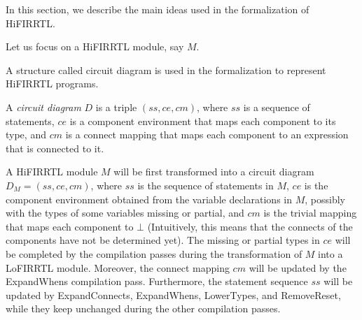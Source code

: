 
In this section, we describe the main ideas used in the formalization of HiFIRRTL.

Let us focus on a HiFIRRTL module, say $M$.

A structure called circuit diagram is used in the formalization to represent HiFIRRTL programs.

\begin{definition}
A \emph{circuit diagram} $D$ is a triple $(ss, ce, cm)$, where $ss$ is a sequence of statements, $ce$ is a component environment that maps each component to its type, and $cm$ is a connect mapping that maps each component to an expression that is connected to it. 
\end{definition}

A HiFIRRTL module $M$ will be first transformed into a circuit diagram $D_M = (ss, ce, cm)$, where $ss$ is the sequence of statements in $M$, $ce$ is the component environment obtained from the variable declarations in $M$, possibly with the types of some variables missing or partial, and $cm$ is the trivial mapping that maps each component to $\bot$ (Intuitively, this means that the connects of the components have not be determined yet). The missing or partial  types in $ce$ will be completed by the compilation passes during the transformation of $M$ into a LoFIRRTL module. Moreover, the connect mapping $cm$ will be updated by the ExpandWhens compilation pass. Furthermore, the statement sequence $ss$ will be updated by ExpandConnects, ExpandWhens, LowerTypes, and RemoveReset, while they keep unchanged during the other compilation passes.  

